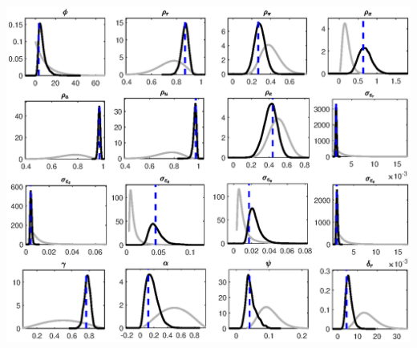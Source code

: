 \documentclass[11pt,preprint, authoryear]{elsarticle}
\let\origfigure\figure
\let\endorigfigure\endfigure
\renewenvironment{figure}[1][2] {
    \expandafter\origfigure\expandafter[H]
} {
    \endorigfigure
}
\numberwithin{equation}{section}
\numberwithin{figure}{section}
\numberwithin{table}{section}
\begin{document}
\begin{figure}
     \centering
     \includegraphics[height=0.4\textheight]{code/posterior_extended.eps}
    \caption{Estimated posterior distributions (black solid line) for the extended sample under the flexible money growth rule (\ref{s2}). The grey line shows the prior density and the black line the density of the posterior distribution. The blue horizontal line indicates the posterior mode.}
        \label{posterior_extended2}
\end{figure}
\end{document}
